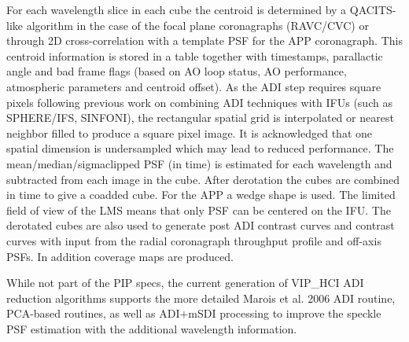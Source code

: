 For each wavelength slice in each cube the centroid is determined by a QACITS-like algorithm in the case of the focal plane coronagraphs (RAVC/CVC) or through 2D cross-correlation with a template PSF for the APP coronagraph. This centroid information is stored in a table together with timestamps, parallactic angle and bad frame flags (based on AO loop status, AO performance, atmospheric parameters and centroid offset).
As the ADI step requires square pixels following previous work on combining ADI techniques with IFUs (such as SPHERE/IFS, SINFONI), the rectangular spatial grid is interpolated or nearest neighbor filled to produce a square pixel image. 
It is acknowledged that one spatial dimension is undersampled which may lead to reduced performance.
The mean/median/sigmaclipped PSF (in time) is estimated for each wavelength and subtracted from each image in the cube. 
After derotation the cubes are combined in time to give a coadded cube. For the APP a wedge shape is used. The limited field of view of the LMS means that only PSF can be centered on the IFU. The derotated cubes are also used to generate post ADI contrast curves and contrast curves with input from the radial coronagraph throughput profile and off-axis PSFs. In addition coverage maps are produced.

While not part of the PIP specs, the current generation of VIP\_HCI ADI reduction algorithms supports
the more detailed Marois et al. 2006 ADI routine, PCA-based routines, as well as ADI+mSDI processing to improve the speckle PSF estimation with the additional wavelength information.



